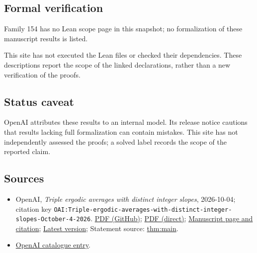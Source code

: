 \documentclass[11pt]{article}
\begin{document}
\subsection{Formal verification}
Family 154 has no Lean scope page in this snapshot; no formalization of these manuscript results is listed.

This site has not executed the Lean files or checked their dependencies. These descriptions report the scope of the linked declarations, rather than a new verification of the proofs.

\subsection{Status caveat}
OpenAI attributes these results to an internal model. Its release notice cautions that results lacking full formalization can contain mistakes. This site has not independently assessed the proofs; a solved label records the scope of the reported claim.

\subsection{Sources}
\begin{itemize}
\item OpenAI, \emph{Triple ergodic averages with distinct integer slopes}, 2026-10-04; citation key \texttt{OAI:Triple-ergodic-averages-with-distinct-integer-slopes-October-4-2026}. \href{https://github.com/openai/math/blob/adc7f1241b42e322a6451854ab7e4b4c146bf78a/preprints/Triple-ergodic-averages-with-distinct-integer-slopes-October-4-2026/triple-ergodic-distinct-slopes.pdf}{PDF (GitHub)}; \href{https://github.com/openai/math/raw/adc7f1241b42e322a6451854ab7e4b4c146bf78a/preprints/Triple-ergodic-averages-with-distinct-integer-slopes-October-4-2026/triple-ergodic-distinct-slopes.pdf}{PDF (direct)}; \href{https://github.com/openai/math/blob/adc7f1241b42e322a6451854ab7e4b4c146bf78a/preprints/Triple-ergodic-averages-with-distinct-integer-slopes-October-4-2026/README.md}{Manuscript page and citation}; \href{https://github.com/openai/math/blob/main/preprints/Triple-ergodic-averages-with-distinct-integer-slopes-October-4-2026/triple-ergodic-distinct-slopes.pdf}{Latest version}; Statement source: \href{https://github.com/openai/math/blob/adc7f1241b42e322a6451854ab7e4b4c146bf78a/preprints/Triple-ergodic-averages-with-distinct-integer-slopes-October-4-2026/build/sections/introduction.tex\#L19}{thm:main}.
\item \href{https://github.com/openai/math/blob/adc7f1241b42e322a6451854ab7e4b4c146bf78a/CONTENTS.md}{OpenAI catalogue entry}.
\end{itemize}
\end{document}
